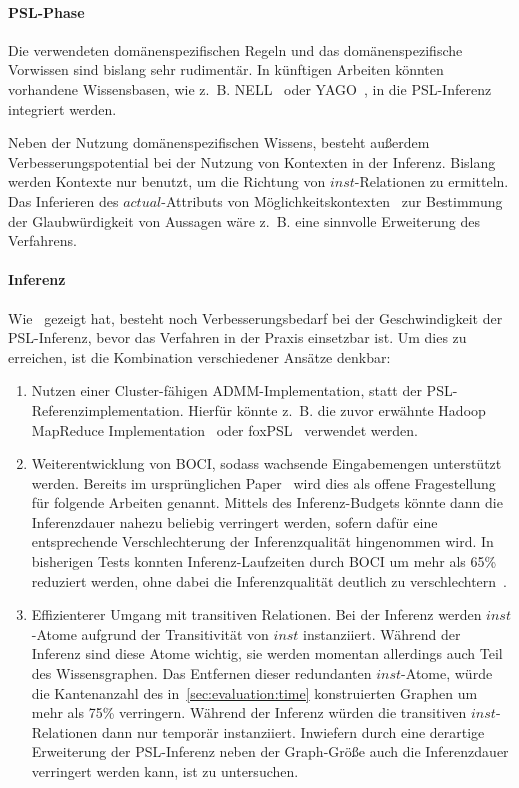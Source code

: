 \paragraph{PSL-Phase}
Die verwendeten domänenspezifischen Regeln und das domänenspezifische Vorwissen sind bislang sehr rudimentär.
In künftigen Arbeiten könnten vorhandene Wissensbasen, wie z.~B. NELL~\cite{Carlson2010} oder YAGO~\cite{YAGO}, in die PSL-Inferenz integriert werden.

Neben der Nutzung domänenspezifischen Wissens, besteht außerdem Verbesserungspotential bei der Nutzung von Kontexten in der Inferenz.
Bislang werden Kontexte nur benutzt, um die Richtung von $inst$-Relationen zu ermitteln.
Das Inferieren des $actual$-Attributs von Möglichkeitskontexten~ zur Bestimmung der Glaubwürdigkeit von Aussagen wäre z.~B. eine sinnvolle Erweiterung des Verfahrens.

\paragraph{Inferenz}
Wie~ gezeigt hat, besteht noch Verbesserungsbedarf bei der Geschwindigkeit der PSL-Inferenz, bevor das Verfahren in der Praxis einsetzbar ist.
Um dies zu erreichen, ist die Kombination verschiedener Ansätze denkbar:
\begin{enumerate}
	\item Nutzen einer Cluster-fähigen ADMM-Implementation, statt der PSL-Referenz\-implementation.
		Hierfür könnte z.~B. die zuvor erwähnte Hadoop MapReduce Implementation~\cite{Lubell-Doughtie2013} oder foxPSL~\cite{Magliacane2015} verwendet werden.
	\item Weiterentwicklung von BOCI, sodass wachsende Eingabemengen unterstützt werden.
		Bereits im ursprünglichen Paper~\cite[Abschnitt 6]{Pujara2015} wird dies als offene Fragestellung für folgende Arbeiten genannt.
		Mittels des Inferenz-Budgets könnte dann die Inferenzdauer nahezu beliebig verringert werden, sofern dafür eine entsprechende Verschlechterung der Inferenzqualität hingenommen wird.
		In bisherigen Tests konnten Inferenz-Laufzeiten durch BOCI um mehr als 65\% reduziert werden, ohne dabei die Inferenzqualität deutlich zu verschlechtern~\cite[Abschnitt 5]{Pujara2015}.
	\item Effizienterer Umgang mit transitiven Relationen.
		Bei der Inferenz werden $inst$-Atome aufgrund der Transitivität von $inst$ instanziiert.
		Während der Inferenz sind diese Atome wichtig, sie werden momentan allerdings auch Teil des Wissensgraphen.
		Das Entfernen dieser redundanten $inst$-Atome, würde die Kantenanzahl des in~\ref{sec:evaluation:time} konstruierten Graphen um mehr als 75\% verringern.
		Während der Inferenz würden die transitiven $inst$-Relationen dann nur temporär instanziiert.
		Inwiefern durch eine derartige Erweiterung der PSL-Inferenz neben der Graph-Größe auch die Inferenzdauer verringert werden kann, ist zu untersuchen.
\end{enumerate}

